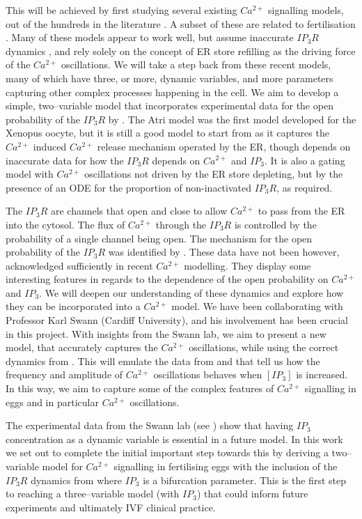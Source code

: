 {This will be achieved by first studying several existing $Ca^{2+}$ signalling models, out of the hundreds in the literature \cite{dupont}. A subset of these are related to fertilisation . Many of these models appear to work well, but assume inaccurate $IP_3R$ dynamics , and rely solely on the concept of ER store refilling as the driving force of the $Ca^{2+}$ oscillations. We will take a step back from these recent models, many of which have three, or more, dynamic variables, and more parameters capturing other complex processes happening in the cell. We aim to develop a simple, two--variable model that incorporates experimental data for the open probability of the $IP_3R$ by . The Atri model was the first model developed for the Xenopus oocyte, but it is still a good model to start from {as it captures the $Ca^{2+}$ induced $Ca^{2+}$ release mechanism operated by the ER, though depends on inaccurate data for how the $IP_3R$ depends on $Ca^{2+}$ and $IP_3$.} It is also a gating model with $Ca^{2+}$ oscillations not driven by the ER store depleting, but by the presence of an ODE for the proportion of non-inactivated $IP_3R$, as required.

The $IP_3R$ are channels that open and close to allow $Ca^{2+}$ to pass from the ER into the cytosol. The flux of $Ca^{2+}$ through the $IP_3R$ is controlled by the probability of a single channel being open. The mechanism for the open probability of the $IP_3R$ was identified by . These data have not been however, acknowledged sufficiently in recent $Ca^{2+}$ modelling. They display some interesting features in regards to the dependence of the open probability on $Ca^{2+}$ and $IP_3$. We will deepen our understanding of these dynamics and explore how they can be incorporated into a $Ca^{2+}$ model. We have been collaborating with Professor Karl Swann (Cardiff University), and his involvement has been crucial in this project. With insights from the Swann lab, we aim to present a new model, that accurately captures the $Ca^{2+}$ oscillations, while using the correct dynamics from . This will emulate the data from  and  that tell us how the frequency and amplitude of $Ca^{2+}$ oscillations behaves when $[IP_3]$ is increased. In this way, we aim to capture some of the complex features of $Ca^{2+}$ signalling in eggs and in particular $Ca^{2+}$ oscillations.

The experimental data from the Swann lab (see ) show that having $IP_3$ concentration as a dynamic variable is essential in a future model. In this work we set out to complete the initial important step towards this by deriving a two--variable model for $Ca^{2+}$ signalling in fertilising eggs with the inclusion of the $IP_3R$ dynamics from  where $IP_3$ is a bifurcation parameter. This is the first step to reaching a three--variable model (with $IP_3$) that could inform future experiments and ultimately IVF clinical practice.

}
